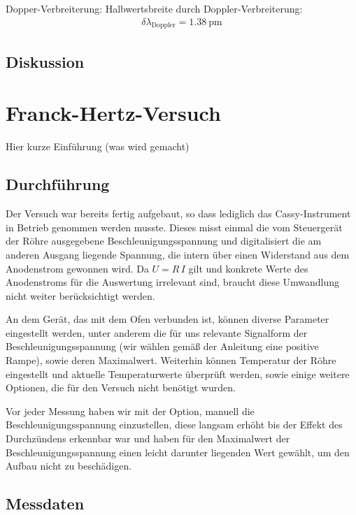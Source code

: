 \documentclass[11pt, a4paper]{article}
\begin{document}
Dopper-Verbreiterung: Halbwertsbreite durch Doppler-Verbreiterung:
\begin{align}
	\delta \lambda_\mathrm{Doppler} = \SI{1.38}{\pico\metre}
\end{align}


\subsection{Diskussion}

\FloatBarrier

\section{Franck-Hertz-Versuch}
Hier kurze Einführung (was wird gemacht)

\subsection{Durchführung}

Der Versuch war bereits fertig aufgebaut, so dass lediglich das Cassy-Instrument in Betrieb genommen werden musste.
Dieses misst einmal die vom Steuergerät der Röhre ausgegebene Beschleunigungsspannung und digitalisiert die am anderen Ausgang liegende Spannung, die intern über einen Widerstand aus dem Anodenstrom gewonnen wird.
Da $U=R\,I$ gilt und konkrete Werte des Anodenstroms für die Auswertung irrelevant sind, braucht diese Umwandlung nicht weiter berücksichtigt werden.

An dem Gerät, das mit dem Ofen verbunden ist, können diverse Parameter eingestellt werden, unter anderem die für uns relevante Signalform der Beschleunigungsspannung (wir wählen gemäß der Anleitung eine positive Rampe), sowie deren Maximalwert.
Weiterhin können Temperatur der Röhre eingestellt und aktuelle Temperaturwerte überprüft werden, sowie einige weitere Optionen, die für den Versuch nicht benötigt wurden.

Vor jeder Messung haben wir mit der Option, manuell die Beschleunigungsspannung einzustellen, diese langsam erhöht bis der Effekt des Durchzündens erkennbar war und haben für den Maximalwert der Beschleunigungsspannung einen leicht darunter liegenden Wert gewählt, um den Aufbau nicht zu beschädigen.

\subsection{Messdaten}
\end{document}
